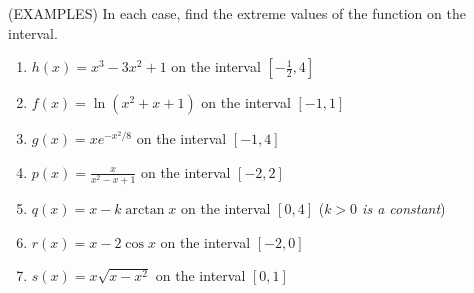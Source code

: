 \documentclass[11pt]{article}
\begin{document}
   \vspace{1in}

   
(EXAMPLES)
In each case, find the extreme values of the function on the interval.
   
 \begin{enumerate}
 \item{$h(x) = x^3-3x^2 + 1$ on the interval $[-\frac12, 4]$}
   \vspace{2in}
 \item{$f(x) =\ln{(x^2+x+1)}$ on the interval $[-1,1]$}
   \vspace{2in}
 \item{$g(x) = xe^{-x^2/8}$ on the interval $[-1, 4]$}
   \vspace{2in}
 \item{$p(x) = \frac{x}{x^2-x+1}$ on the interval $[-2, 2]$}
   \vspace{2.5in}
 \item{$q(x) = x-k\arctan{x}$ on the interval $[0,4 ]$ \quad (\emph{$k>0$ is a constant})}
   \vspace{2.5in}
   \item{$r(x) = x-2\cos{x}$ on the interval $[-2,0]$ }
   \vspace{2.5in}
   \item{$s(x) = x\sqrt{x-x^2}$ on the interval $[0,1]$ }
 \end{enumerate}

   \pagebreak
\end{document}
